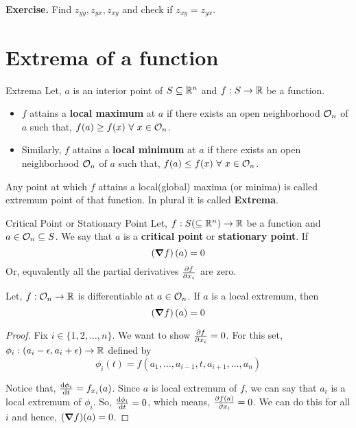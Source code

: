 \documentclass[../Analysis-3]{subfiles}
\begin{document}
\textbf{Exercise.} Find $z_{yy}, z_{yx}, z_{xy}$ and check if $z_{xy} = z_{yx}$.

\section{Extrema of a function}

\begin{Def}{Extrema}{}
    Let, $a$ is an interior point of $S \subseteq \mathbb{R}^n$ and $f : S \to \mathbb{R}$ be a function. 

    \begin{itemize}
        \item $f$ attains a \textbf{local maximum} at $a$ if there exists an open neighborhood $\mathcal{O}_{n}$ of $a$ such that, $f(a) \geq f(x)\ \forall\ x \in \mathcal{O}_{n}$.
        \item Similarly, $f$ attains a \textbf{local minimum} at $a$ if there exists an open neighborhood $\mathcal{O}_{n}$ of $a$ such that, $f(a) \leq f(x)\ \forall\ x \in \mathcal{O}_{n}$.
    \end{itemize}
    
  Any point at which $f$ attains a local(global) maxima (or minima)  is called extremum point of that function. In plural it is called \textbf{Extrema}.
\end{Def}

\begin{Def}{Critical Point or Stationary Point}{}
    Let, $f : S (\subseteq \mathbb{R}^n) \to \mathbb{R}$ be a function and $a \in \mathcal{O}_{n} \subseteq S$. We say that $a$ is a \textbf{critical point} or \textbf{stationary point}.
    If \[ \left(\grad f\right)(a) = 0\]
    Or, equvalently all the partial derivatives $\pdv{f}{x_i}$ are zero. 
\end{Def}

\begin{Thm}{}{}
    Let, $f: \mathcal{O}_{n} \to \mathbb{R}$ is differentiable at $a \in \mathcal{O}_{n}$. If $a$ is a local extremum, then \[ \left(\grad f\right)(a) = 0 \]
\end{Thm}

\begin{proof}
    Fix $i \in \{1,2, \ldots, n\}$. We want to show $\pdv{f}{x_i} = 0$. For this set, $\phi_i : (a_i - \epsilon, a_i + \epsilon) \to \mathbb{R}$ defined by $$ \phi_i(t) = f(a_1, \ldots, a_{i-1}, t, a_{i+1}, \ldots, a_n)$$
    
  Notice that, $\dv{\phi_i}{t}(a_i) = f_{x_i}(a)$. Since $a$ is local extremum of $f$, we can say that $a_i$ is a local extremum of $\phi_i$. So, $\dv{\phi_i}{t}(a_i) = 0$, which means, $\pdv{f(a)}{x_i} = 0$. We can do this for all $i$ and hence, $(\grad f)(a) = 0$.
\end{proof}
\end{document}
